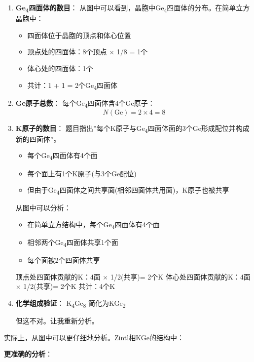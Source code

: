 \begin{enumerate}
\def\labelenumi{\arabic{enumi}.}
\item
  \textbf{Ge\textsubscript{4}四面体的数目}：
  从图中可以看到，晶胞中Ge\textsubscript{4}四面体的分布。在简单立方晶胞中：

  \begin{itemize}
  \tightlist
  \item
    四面体位于晶胞的顶点和体心位置
  \item
    顶点处的四面体：8个顶点 × 1/8 = 1个
  \item
    体心处的四面体：1个
  \item
    共计：1 + 1 = 2个Ge\textsubscript{4}四面体
  \end{itemize}
\item
  \textbf{Ge原子总数}：
  每个Ge\textsubscript{4}四面体含4个Ge原子：
  \[N(\text{Ge}) = 2 \times 4 = 8\]
\item
  \textbf{K原子的数目}：
  题目指出''每个K原子与Ge\textsubscript{4}四面体面的3个Ge形成配位并构成新的四面体''。

  \begin{itemize}
  \tightlist
  \item
    每个Ge\textsubscript{4}四面体有4个面
  \item
    每个面上有1个K原子(与3个Ge配位)
  \item
    但由于Ge\textsubscript{4}四面体之间共享面(相邻四面体共用面)，K原子也被共享
  \end{itemize}

  从图中可以分析：

  \begin{itemize}
  \tightlist
  \item
    在简单立方结构中，每个Ge\textsubscript{4}四面体有4个面
  \item
    相邻两个Ge\textsubscript{4}四面体共享1个面
  \item
    每个面被2个四面体共享
  \end{itemize}

  顶点处四面体贡献的K：4面 × 1/2(共享)= 2个K
  体心处四面体贡献的K：4面 × 1/2(共享)= 2个K
  共计：4个K
\item
  \textbf{化学组成验证}：
  K\textsubscript{4}Ge\textsubscript{8} \箭 简化为KGe\textsubscript{2}

  但这不对。让我重新分析。
\end{enumerate}

实际上，从图中可以更仔细地分析。Zintl相KGe的结构中：

\textbf{更准确的分析}：

